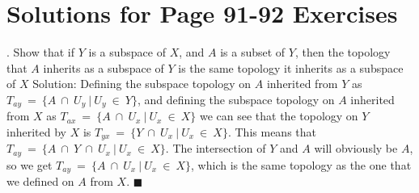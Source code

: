 \documentclass{article}
\begin{document}
\section{Solutions for Page 91-92 Exercises}
\newline{}. Show that if $Y$ is a subspace of $X$, and $A$ is a subset of $Y$, then the topology that $A$ inherits as a subspace of $Y$ is the same topology it inherits as a subspace of $X$
\newline\newline
Solution: Defining the subspace topology on $A$ inherited from $Y$ as $T_{ay} \ = \ \{A \ \cap \ U_{y} \ | \ U_{y} \ \in \ Y\}$, and defining the subspace topology on $A$ inherited from $X$ as $T_{ax} \ = \ \{A \ \cap \ U_{x} \ | \ U_{x} \ \in \ X\}$ we can see that the topology on $Y$ inherited by $X$ is $T_{yx} \ = \ \{Y \ \cap \ U_{x} \ | \ U_{x} \ \in \ X\}$. This means that $T_{ay} \ = \ \{A \ \cap \ Y \ \cap \ U_{x} \ | \ U_{x} \ \in \ X\}$. The intersection of $Y$ and $A$ will obviously be $A$, so we get $T_{ay} \ = \ \{A \ \cap \ U_{x} \ | \ U_{x} \ \in \ X\}$, which is the same topology as the one that we defined on $A$ from $X$. $\blacksquare$
\newline\newline
\end{document}
